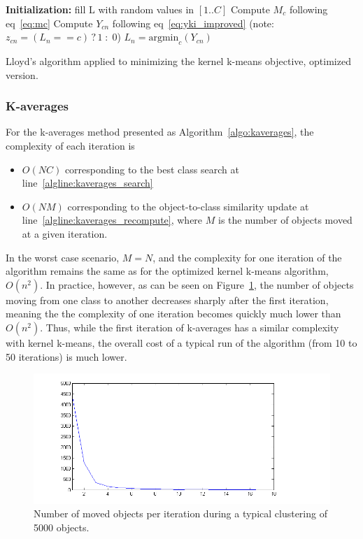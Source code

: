\documentclass[a4paper,twoside]{article}
\begin{document}
\begin{algorithm}
	\label{algo:kkmeans_optim}
	\SetAlgoLined
	\BlankLine	
	\textbf{Initialization:}
	fill L with random values in $[1..C]$\;
	\BlankLine	
	 {
	     {
	        Compute $M_c$ following eq~\ref{eq:mc} \label{algline:kkmeans_imp_mc}
	    }
		 {
			 {
				Compute $Y_{cn}$ following eq~\ref{eq:yki_improved} \label{algline:kkmeans_imp_cplx1}
				(note: $z_{cn} = (L_n == c)\,?\,1\;:\;0$)
			}
			$L_n = \textrm{argmin}_c (Y_{cn})$\;
		}
	}
	\BlankLine
	\caption{Lloyd's algorithm applied to minimizing the kernel k-means objective, optimized version.}
\end{algorithm}


\subsubsection{K-averages}

For the k-averages method presented as Algorithm~\ref{algo:kaverages}, the complexity of each iteration is
\begin{itemize}
\item $O(NC)$ corresponding to the best class search at line~\ref{algline:kaverages_search}
\item  $O(NM)$ corresponding to the object-to-class similarity update at line~\ref{algline:kaverages_recompute}, where $M$ is the number of objects moved at a given iteration.
\end{itemize}

In the worst case scenario, $M = N$, and the complexity for one iteration of the algorithm remains the same as for the optimized kernel k-means algorithm, $O(n^2)$. In practice, however, as can be seen on Figure~\ref{fig:moved}, the number of objects moving from one class to another decreases sharply after the first iteration, meaning the the complexity of one iteration becomes quickly much lower than $O(n^2)$. Thus, while the first iteration of k-averages has a similar complexity with kernel k-means, the overall cost of a typical run of the algorithm (from 10 to 50 iterations) is much lower.

\begin{figure}
\label{fig:moved}
\includegraphics[scale=0.6]{figures/nbMoved.png} 
\caption{Number of moved objects per iteration during a typical clustering of 5000 objects.}
\end{figure}
\end{document}
